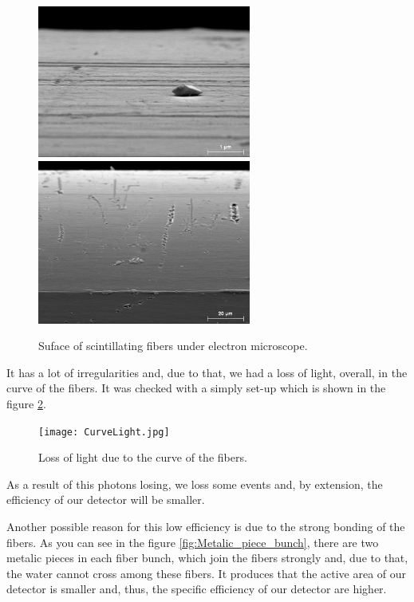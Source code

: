 \begin{figure}[htbp]
\centering
{\includegraphics[width=70mm]{./Figuras/sinclad_3_SE.png}}\hspace{10mm}
{\includegraphics[width=70mm]{./Figuras/sinclad_6_SE.png}}
\caption{Suface of scintillating fibers under electron microscope.} \label{fig:FiberSurfaceElectronMicroscope}
\end{figure}

It has a lot of irregularities and, due to that, we had a loss of light, overall, in the curve of the fibers. It was checked with a simply set-up which is shown in the figure \ref{fig:CurveLight}.

\begin{figure}[htb]
\centering
{
\texttt{[image: CurveLight.jpg]} 
}
\caption{Loss of light due to the curve of the fibers. \label{fig:CurveLight}}
\end{figure}

As a result of this photons losing, we loss some events and, by extension, the efficiency of our detector will be smaller.

Another possible reason for this low efficiency is due to the strong bonding of the fibers. As you can see in the figure \ref{fig:Metalic_piece_bunch}, there are two metalic pieces in each fiber bunch, which join the fibers strongly and, due to that, the water cannot cross among these fibers. It produces that the active area of our detector is smaller and, thus, the specific efficiency of our detector are higher.

